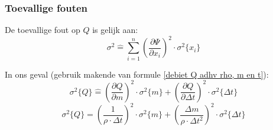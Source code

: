 \subsubsection{Toevallige fouten}
De toevallige fout op $Q$ is gelijk aan:
\begin{equation}
    \sigma^{2} \hat = \sum\limits_{i=1}^n(\frac{\partial \Psi}{\partial x_i})^{2} \cdot \sigma^{2} \{x_i\}
\end{equation}

In ons geval (gebruik makende van formule \eqref{debiet Q adhv rho, m en t}):
\begin{equation}
    \sigma^{2}\{Q\} \hat = (\frac{\partial Q}{\partial m})^{2} \cdot \sigma^{2}\{m\} + (\frac{\partial Q}{\partial \Delta t})^{2} \cdot \sigma^{2}\{\Delta t\}
\end{equation}
\begin{equation}
\sigma^{2}\{Q\} = (\frac{1}{\rho \cdot \Delta t})^{2} \cdot \sigma^{2}\{m\} + (\frac{\Delta m}{\rho \cdot \Delta t^{2}})^{2} \cdot \sigma^{2}\{\Delta t\}
\end{equation}






